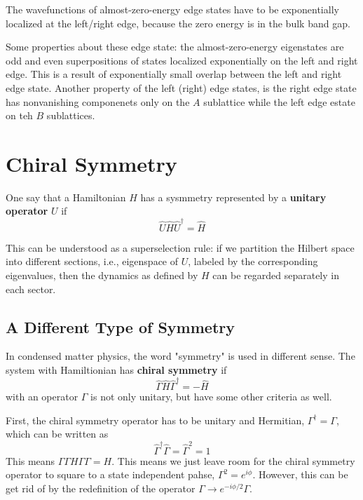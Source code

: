 The wavefunctions of almost-zero-energy edge states have to be exponentially localized at the left/right edge, because the zero energy is in the bulk band gap.

Some properties about these edge state: the almost-zero-energy eigenstates are odd and even superpositions of states localized exponentially on the left and right edge.
This is a result of exponentially small overlap between the left and right edge state.
Another property of the left (right) edge states, is the right edge state has nonvanishing componenets only on the $A$ sublattice while the left edge estate on teh $B$ sublattices.

\section{Chiral Symmetry} \label{sec:1.4}
One say that a Hamiltonian $H$ has a sysmmetry represented by a \textbf{unitary operator} $U$ if
\begin{equation}
    \hat{U}\hat{H}\hat{U}^\dagger = \hat{H}
    \label{eq:1.22}
\end{equation}

This can be understood as a superselection rule: if we partition the Hilbert space into different sections, i.e., eigenspace of $U$, labeled by the corresponding eigenvalues, then the dynamics as defined by $H$ can be regarded separately in each sector.

\subsection{A Different Type of Symmetry} \label{sec:1.4.2}
In condensed matter physics, the word "symmetry" is used in different sense.
The system with Hamiltionian has \textbf{chiral symmetry} if
\begin{equation}
    \hat{\Gamma}\hat{H}\hat{\Gamma}^\dagger = -\hat{H}
    \label{eq:1.23}
\end{equation}
with an operator $\Gamma$ is not only unitary, but have some other criteria as well.

First, the chiral symmetry operator has to be unitary and Hermitian, $\Gamma^\dagger = \Gamma$, which can be written as
\begin{equation}
    \hat{\Gamma}^\dagger \hat{\Gamma} = \hat{\Gamma}^2 = 1
    \label{eq:1.24}
\end{equation}
This means $\Gamma\Gamma H \Gamma\Gamma = H$.
This means we just leave room for the chiral symmetry operator to square to a state independent pahse, $\Gamma^2 = e^{i\phi}$.
However, this can be get rid of by the redefinition of the  operator $\Gamma \to e^{-i\phi/2}\Gamma$.

